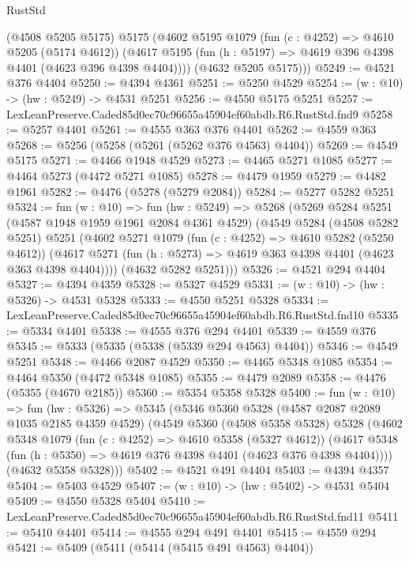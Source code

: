 \begin{lexlean}{RustStd}
\begin{coremodule}
        (@4508 @5205 @5175)
        @5175
        (@4602
          @5195
          @1079
          (fun (c : @4252) => @4610 @5205 (@5174 @4612))
          (@4617 @5195 (fun (h : @5197) => @4619 @396 @4398 @4401 (@4623 @396 @4398 @4404))))
        (@4632 @5205 @5175)))
@5249 := @4521 @376 @4404
@5250 := @4394 @4361
@5251 := @5250 @4529
@5254 := (w : @10) -> (hw : @5249) -> @4531 @5251
@5256 := @4550 @5175 @5251
@5257 := LexLeanPreserve.Caded85d0ec70c96655a45904ef60abdb.R6.RustStd.fnd9
@5258 := @5257 @4401
@5261 := @4555 @363 @376 @4401
@5262 := @4559 @363
@5268 := @5256 (@5258 (@5261 (@5262 @376 @4563) @4404))
@5269 := @4549 @5175
@5271 := @4466 @1948 @4529
@5273 := @4465 @5271 @1085
@5277 := @4464 @5273 (@4472 @5271 @1085)
@5278 := @4479 @1959
@5279 := @4482 @1961
@5282 := @4476 (@5278 (@5279 @2084))
@5284 := @5277 @5282 @5251
@5324 := fun (w : @10) =>
  fun (hw : @5249) =>
  @5268
    (@5269
      @5284
      @5251
      (@4587 @1948 @1959 @1961 @2084 @4361 @4529)
      (@4549
        @5284
        (@4508 @5282 @5251)
        @5251
        (@4602
          @5271
          @1079
          (fun (c : @4252) => @4610 @5282 (@5250 @4612))
          (@4617 @5271 (fun (h : @5273) => @4619 @363 @4398 @4401 (@4623 @363 @4398 @4404))))
        (@4632 @5282 @5251)))
@5326 := @4521 @294 @4404
@5327 := @4394 @4359
@5328 := @5327 @4529
@5331 := (w : @10) -> (hw : @5326) -> @4531 @5328
@5333 := @4550 @5251 @5328
@5334 := LexLeanPreserve.Caded85d0ec70c96655a45904ef60abdb.R6.RustStd.fnd10
@5335 := @5334 @4401
@5338 := @4555 @376 @294 @4401
@5339 := @4559 @376
@5345 := @5333 (@5335 (@5338 (@5339 @294 @4563) @4404))
@5346 := @4549 @5251
@5348 := @4466 @2087 @4529
@5350 := @4465 @5348 @1085
@5354 := @4464 @5350 (@4472 @5348 @1085)
@5355 := @4479 @2089
@5358 := @4476 (@5355 (@4670 @2185))
@5360 := @5354 @5358 @5328
@5400 := fun (w : @10) =>
  fun (hw : @5326) =>
  @5345
    (@5346
      @5360
      @5328
      (@4587 @2087 @2089 @1035 @2185 @4359 @4529)
      (@4549
        @5360
        (@4508 @5358 @5328)
        @5328
        (@4602
          @5348
          @1079
          (fun (c : @4252) => @4610 @5358 (@5327 @4612))
          (@4617 @5348 (fun (h : @5350) => @4619 @376 @4398 @4401 (@4623 @376 @4398 @4404))))
        (@4632 @5358 @5328)))
@5402 := @4521 @491 @4404
@5403 := @4394 @4357
@5404 := @5403 @4529
@5407 := (w : @10) -> (hw : @5402) -> @4531 @5404
@5409 := @4550 @5328 @5404
@5410 := LexLeanPreserve.Caded85d0ec70c96655a45904ef60abdb.R6.RustStd.fnd11
@5411 := @5410 @4401
@5414 := @4555 @294 @491 @4401
@5415 := @4559 @294
@5421 := @5409 (@5411 (@5414 (@5415 @491 @4563) @4404))

\end{coremodule}
\end{lexlean}
